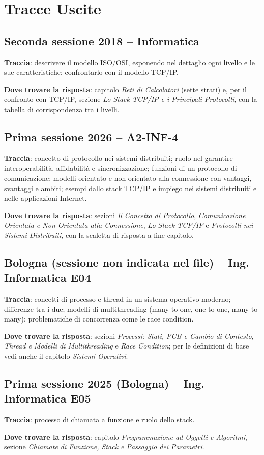 
\section*{Tracce Uscite} %

\subsection*{Seconda sessione 2018 -- Informatica}
\textbf{Traccia}: descrivere il modello ISO/OSI, esponendo nel dettaglio ogni livello e le sue caratteristiche; confrontarlo con il modello TCP/IP.

\textbf{Dove trovare la risposta}: capitolo \emph{Reti di Calcolatori} (sette strati) e, per il confronto con TCP/IP, sezione \emph{Lo Stack TCP/IP e i Principali Protocolli}, con la tabella di corrispondenza tra i livelli.

\subsection*{Prima sessione 2026 -- A2-INF-4}
\textbf{Traccia}: concetto di protocollo nei sistemi distribuiti; ruolo nel garantire interoperabilità, affidabilità e sincronizzazione; funzioni di un protocollo di comunicazione; modelli orientato e non orientato alla connessione con vantaggi, svantaggi e ambiti; esempi dallo stack TCP/IP e impiego nei sistemi distribuiti e nelle applicazioni Internet.

\textbf{Dove trovare la risposta}: sezioni \emph{Il Concetto di Protocollo}, \emph{Comunicazione Orientata e Non Orientata alla Connessione}, \emph{Lo Stack TCP/IP} e \emph{Protocolli nei Sistemi Distribuiti}, con la scaletta di risposta a fine capitolo.

\subsection*{Bologna (sessione non indicata nel file) -- Ing. Informatica E04}
\textbf{Traccia}: concetti di processo e thread in un sistema operativo moderno; differenze tra i due; modelli di multithreading (many-to-one, one-to-one, many-to-many); problematiche di concorrenza come le race condition.

\textbf{Dove trovare la risposta}: sezioni \emph{Processi: Stati, PCB e Cambio di Contesto}, \emph{Thread e Modelli di Multithreading} e \emph{Race Condition}; per le definizioni di base vedi anche il capitolo \emph{Sistemi Operativi}.

\subsection*{Prima sessione 2025 (Bologna) -- Ing. Informatica E05}
\textbf{Traccia}: processo di chiamata a funzione e ruolo dello stack.

\textbf{Dove trovare la risposta}: capitolo \emph{Programmazione ad Oggetti e Algoritmi}, sezione \emph{Chiamate di Funzione, Stack e Passaggio dei Parametri}.
